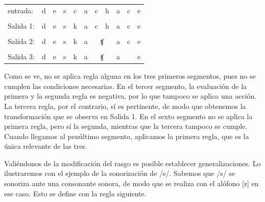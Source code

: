 \begin{center}
	\begin{tabular}{ l|*{10}{c}} 
		entrada: &  \multicolumn{1}{|c|}{d} &  \multicolumn{1}{|c|}{e} &  \multicolumn{1}{|c|}{s}&  \multicolumn{1}{|c|}{c} &  \multicolumn{1}{|c|}{a} &  \multicolumn{1}{|c|}{c} &  \multicolumn{1}{|c|}{h} &  \multicolumn{1}{|c|}{a} &  \multicolumn{1}{|c|}{c} &  \multicolumn{1}{|c|}{e} \\ 
		&   &  &  & \uparrow& &  &  &  &  & \\
		Salida 1: &   \multicolumn{1}{|c|}{d} &  \multicolumn{1}{|c|}{e} &  \multicolumn{1}{|c|}{s}&  \multicolumn{1}{|c|}{k} &  \multicolumn{1}{|c|}{a} &  \multicolumn{1}{|c|}{c} &  \multicolumn{1}{|c|}{h} &  \multicolumn{1}{|c|}{a} &  \multicolumn{1}{|c|}{c} &  \multicolumn{1}{|c|}{e} \\ 
				&   &  &  & & &  \uparrow &  &  &  & \\
			Salida 2: &   \multicolumn{1}{|c|}{d} &  \multicolumn{1}{|c|}{e} &  \multicolumn{1}{|c|}{s}&  \multicolumn{1}{|c|}{k} &  \multicolumn{1}{|c|}{a} &  \multicolumn{2}{|c|}{ʧ} &  \multicolumn{1}{|c|}{a} &  \multicolumn{1}{|c|}{c} &  \multicolumn{1}{|c|}{e} \\
				&   &  &  & & &   &  &  & \uparrow & \\
					Salida 3: &   \multicolumn{1}{|c|}{d} &  \multicolumn{1}{|c|}{e} &  \multicolumn{1}{|c|}{s}&  \multicolumn{1}{|c|}{k} &  \multicolumn{1}{|c|}{a} &  \multicolumn{2}{|c|}{ʧ} &  \multicolumn{1}{|c|}{a} &  \multicolumn{1}{|c|}{\textipa{T}} &  \multicolumn{1}{|c|}{e} \\
	\end{tabular}
\end{center}
Como se ve, no se aplica regla alguna en los tres primeros segmentos, pues no se cumplen las condiciones necesarias. En el tercer segmento, la evaluación de la primera y la segunda regla es negativa, por lo que tampoco se aplica una acción. La tercera regla, por el contrario, sí es pertinente, de modo que obtenemos la transformación que se observa en Salida 1. En el sexto segmento no se aplica la primera regla, pero sí la segunda, mientras que la tercera tampoco se cumple. Cuando llegamos al penúltimo segmento, aplicamos la primera regla, que es la única relevante de las tres.  

Valiéndonos de la modificación del rasgo es posible establecer generalizaciones. Lo ilustraremos con el ejemplo de la sonorización de /s/. Sabemos que /s/ se sonoriza ante una consonante sonora, de modo que se realiza con el alófono [z] en ese caso. Esto se define con la regla siguiente.

